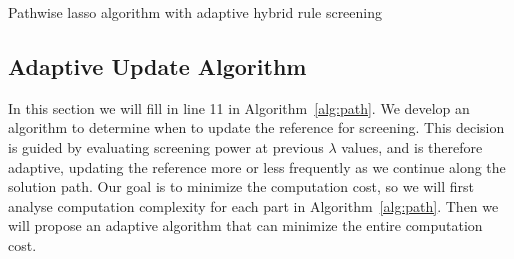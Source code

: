 \documentclass[]{interact}
\theoremstyle{plain}%
\theoremstyle{definition}
\theoremstyle{remark}
\begin{document}
\begin{algorithm}[H]
  \label{alg:path}
    \SetAlgoLined
    \BlankLine
    
    \caption{Pathwise lasso algorithm with adaptive hybrid rule screening}
\end{algorithm}

\subsection{Adaptive Update Algorithm}
\label{sec:adaptive}

In this section we will fill in line 11 in Algorithm~\ref{alg:path}. We develop an algorithm to determine when to update the reference for screening. This decision is guided by evaluating screening power at previous $\lambda$ values, and is therefore adaptive, updating the reference more or less frequently as we continue along the solution path. Our goal is to minimize the computation cost, so we will first analyse computation complexity for each part in Algorithm~\ref{alg:path}. Then we will propose an adaptive algorithm that can minimize the entire computation cost.
\end{document}
